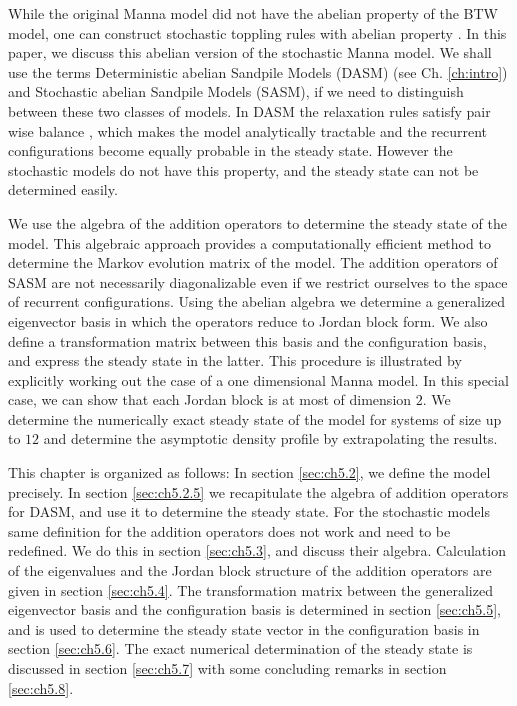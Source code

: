 \documentclass[11pt,a4paper]{book}
\begin{document}
While the original Manna model did not have the abelian property of
the BTW model, one can construct stochastic toppling rules with
abelian property \cite{sasm}. In this paper, we discuss this abelian
version of the stochastic Manna model. We 
shall use the terms Deterministic abelian Sandpile Models (DASM)
(see Ch. \ref{ch:intro})  and 
Stochastic abelian Sandpile Models (SASM), if we need to distinguish 
between these two classes of models. 
In DASM the relaxation rules satisfy pair wise balance
\cite{barma}, which makes the model analytically tractable and the
recurrent configurations become equally probable in the steady state. However
the stochastic models do not have this property, and the steady
state can not be determined easily.


We use the algebra of the addition operators to determine the steady 
state of the model. This algebraic approach provides a computationally 
efficient method to determine the Markov evolution matrix of the model. 
The addition operators of SASM are not necessarily diagonalizable even 
if we restrict ourselves to the space of recurrent configurations. Using 
the abelian algebra we determine a generalized eigenvector basis in 
which the operators reduce to Jordan block form. We also define a 
transformation matrix between this basis and the configuration basis, 
and express the steady state in the latter. This procedure is 
illustrated by explicitly working out the case of a one dimensional 
Manna model. In this special case, we can show that each Jordan block is 
at most of dimension $2$. We determine the numerically exact steady 
state of the model for systems of size up to $12$ and determine the 
asymptotic density profile by extrapolating the results.

This chapter is organized as follows: In section \ref{sec:ch5.2}, we define the model 
precisely. In section \ref{sec:ch5.2.5} we recapitulate the algebra of
addition operators for DASM, and use it to determine the steady state.
For the stochastic models same definition for the addition operators
does not work and need to be redefined. We do this in section
\ref{sec:ch5.3}, and discuss their algebra. Calculation of the eigenvalues and the 
Jordan block structure of the addition operators are given in section
\ref{sec:ch5.4}. 
The transformation matrix between the generalized eigenvector basis 
and the configuration basis is determined in section \ref{sec:ch5.5}, and is used to 
determine the steady state vector in the configuration basis in section \ref{sec:ch5.6}. The exact numerical determination of the steady state is discussed 
in section \ref{sec:ch5.7} with some concluding remarks in section \ref{sec:ch5.8}.
 
\end{document}

